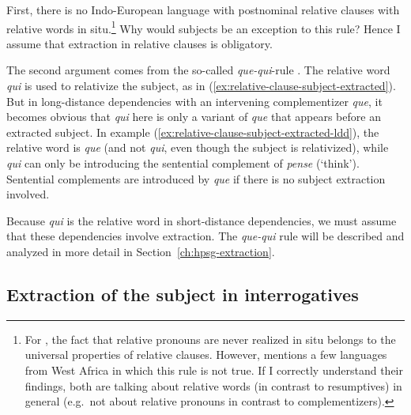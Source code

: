 First, there is no Indo-European language with postnominal relative clauses with relative words in situ.\footnote{For \citet{Downing.1978}, the fact that relative pronouns are never realized in situ belongs to the universal properties of relative clauses. However, \citet[37]{Vries.2002} mentions a few languages from West Africa in which this rule is not true. If I correctly understand their findings, both are talking about relative words (in contrast to resumptives) in general (e.g.\ not about relative pronouns in contrast to complementizers).}
Why would subjects be an exception to this rule? Hence I assume that extraction in relative clauses is obligatory.

The second argument comes from the so-called \emph{que-qui}-rule \citep[see a.o.][]{Kayne.1974.1975,Kayne.1976,Pesetsky.1982,Koopman.2014}. The relative word \emph{qui} is used to relativize the subject, as in (\ref{ex:relative-clause-subject-extracted}). But in long-distance dependencies with an intervening complementizer \emph{que}, it becomes obvious that \emph{qui} here is only a variant of \emph{que} that appears before an extracted subject. In example (\ref{ex:relative-clause-subject-extracted-ldd}), the relative word is \emph{que} (and not \emph{qui}, even though the subject is relativized), while \emph{qui} can only be introducing the sentential complement of \emph{pense} (`think'). Sentential complements are introduced by \emph{que} if there is no subject extraction involved.

\eal
{}
\label{ex:relative-clause-subject-extracted-ldd}
\zl 

Because \emph{qui} is the relative word in short-distance dependencies, we must assume that these dependencies involve extraction. The \emph{que-qui} rule will be described and analyzed in more detail in Section~\ref{ch:hpsg-extraction}.  

\subsection{Extraction of the subject in interrogatives}

